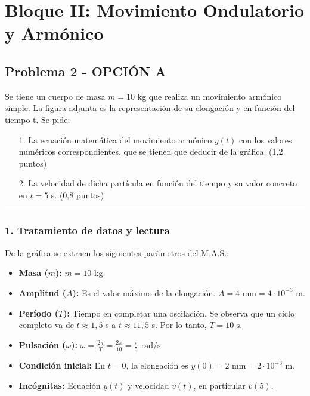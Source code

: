 \newpage

\section{Bloque II: Movimiento Ondulatorio y Armónico}
\label{sec:mas_2005_jun_cv}

\subsection{Problema 2 - OPCIÓN A}
\label{subsec:2A_2005_jun_cv}

\begin{cajaenunciado}
Se tiene un cuerpo de masa $m=10$ kg que realiza un movimiento armónico simple. La figura adjunta es la representación de su elongación y en función del tiempo t. Se pide:
\begin{enumerate}
    \item[1.] La ecuación matemática del movimiento armónico $y(t)$ con los valores numéricos correspondientes, que se tienen que deducir de la gráfica. (1,2 puntos)
    \item[2.] La velocidad de dicha partícula en función del tiempo y su valor concreto en $t=5$ s. (0,8 puntos)
\end{enumerate}
\end{cajaenunciado}
\hrule

\subsubsection*{1. Tratamiento de datos y lectura}
De la gráfica se extraen los siguientes parámetros del M.A.S.:
\begin{itemize}
    \item \textbf{Masa ($m$):} $m=10$ kg.
    \item \textbf{Amplitud ($A$):} Es el valor máximo de la elongación. $A = 4 \text{ mm} = 4 \cdot 10^{-3} \text{ m}$.
    \item \textbf{Período ($T$):} Tiempo en completar una oscilación. Se observa que un ciclo completo va de $t \approx 1,5$ s a $t \approx 11,5$ s. Por lo tanto, $T = 10 \text{ s}$.
    \item \textbf{Pulsación ($\omega$):} $\omega = \frac{2\pi}{T} = \frac{2\pi}{10} = \frac{\pi}{5} \text{ rad/s}$.
    \item \textbf{Condición inicial:} En $t=0$, la elongación es $y(0) = 2 \text{ mm} = 2 \cdot 10^{-3} \text{ m}$.
    \item \textbf{Incógnitas:} Ecuación $y(t)$ y velocidad $v(t)$, en particular $v(5)$.
\end{itemize}

